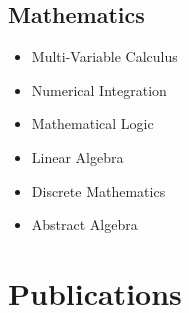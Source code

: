 \documentclass[10pt,letterpaper,roman]{moderncv}
\begin{document}
\subsection{Mathematics}
\vspace{-\topsep}
\begin{multicols}{3}
\begin{itemize}
  \item Multi-Variable Calculus
  \item Numerical Integration
  \item Mathematical Logic
  \item Linear Algebra
  \item Discrete Mathematics
  \item Abstract Algebra
\end{itemize}
\end{multicols}

\section{Publications}
  \nocite{*}
  \printbibliography[heading=none]{}
\end{document}
